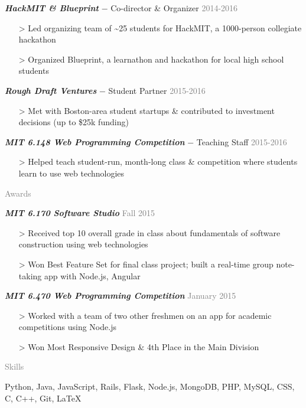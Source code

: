 \documentclass[11pt]{article}
\newcommand{\rsection}[1]{\vspace{1.5em}\textcolor{gray}{\Large \robotoslab #1}\vspace{0.5em}}
\newcommand{\bt}[1]{\textit{\textbf{#1}}} %
\newcommand{\gap}[0]{\vspace{0.3em}} %
\newcommand{\dash}[0]{ $-$ } %
\newcommand{\gray}[1]{\textcolor{gray}{#1}}
\newcommand{\e}[0]{> }
\begin{document}
\bt{HackMIT \& Blueprint}\dash Co-director \& Organizer \hfill \gray{2014-2016}

\begin{itemize}
\item[\e] Led organizing team of \textasciitilde 25 students for HackMIT, a 1000-person collegiate hackathon
\item[\e] Organized Blueprint, a learnathon and hackathon for local high school students
\end{itemize}

\gap

\bt{Rough Draft Ventures}\dash Student Partner \hfill \gray{2015-2016}

\begin{itemize}
\item[\e] Met with Boston-area student startups \& contributed to investment decisions (up to \$25k funding)
\end{itemize}

\gap

\bt{MIT 6.148 Web Programming Competition}\dash Teaching Staff \hfill \gray{2015-2016}

\begin{itemize}
\item[\e] Helped teach student-run, month-long class \& competition where students learn to use web technologies
\end{itemize}

\rsection{Awards}

\bt{MIT 6.170 Software Studio} \hfill \gray{Fall 2015}

\begin{itemize}
\item[\e] Received top 10 overall grade in class about fundamentals of software construction using web technologies
\item[\e] Won Best Feature Set for final class project; built a real-time group note-taking app with Node.js, Angular
\end{itemize}

\gap

\bt{MIT 6.470 Web Programming Competition} \hfill \gray{January 2015}

\begin{itemize}
\item[\e] Worked with a team of two other freshmen on an app for academic competitions using Node.js
\item[\e] Won Most Responsive Design \& 4th Place in the Main Division
\end{itemize}

\rsection{Skills}

Python, Java, JavaScript, Rails, Flask, Node.js, MongoDB, PHP, MySQL, CSS, C, C++, Git, {\selectfont\LaTeX}
\end{document}
